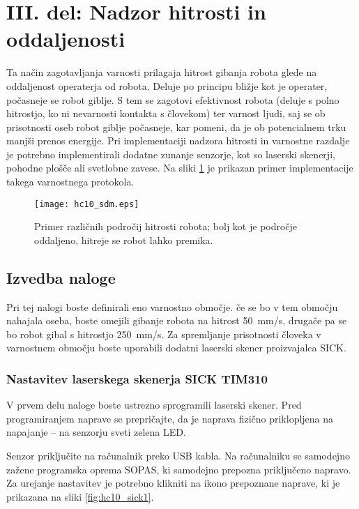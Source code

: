 \section{III. del: Nadzor hitrosti in oddaljenosti}

Ta način zagotavljanja varnosti prilagaja hitrost gibanja robota glede na oddaljenost operaterja od robota. Deluje po principu bližje kot je operater, počasneje se robot giblje. S tem se zagotovi efektivnost robota (deluje s polno hitrostjo, ko ni nevarnosti kontakta s človekom) ter varnost ljudi, saj se ob prisotnosti oseb robot giblje počasneje, kar pomeni, da je ob potencialnem trku manjši prenos energije. Pri implementaciji nadzora hitrosti in varnostne razdalje je potrebno implementirali dodatne zunanje senzorje, kot so laserski skenerji, pohodne plošče ali svetlobne zavese. Na sliki \ref{fig:hc10_sdm} je prikazan primer implementacije takega varnostnega protokola.

\begin{figure}[!hbt]
	\centering
	\texttt{[image: hc10\_sdm.eps]}
	\caption{Primer različnih področij hitrosti robota; bolj kot je področje oddaljeno, hitreje se robot lahko premika.}
	\label{fig:hc10_sdm}
\end{figure}

\subsection*{Izvedba naloge}

Pri tej nalogi boste definirali eno varnostno območje. če se bo v tem območju nahajala oseba, boste omejili gibanje robota na hitrost 50~mm/s, drugače pa se bo robot gibal s hitrostjo 250~mm/s. Za spremljanje prisotnosti človeka v varnostnem območju boste uporabili dodatni laserski skener proizvajalca SICK.

\subsubsection*{Nastavitev laserskega skenerja SICK TIM310}

V prvem delu naloge boste ustrezno sprogramili laserski skener. Pred programiranjem naprave se prepričajte, da je naprava fizično priklopljena na napajanje -- na senzorju sveti zelena LED.

Senzor priključite na računalnik preko USB kabla. Na računalniku se samodejno zažene programska oprema SOPAS, ki samodejno prepozna priključeno napravo. Za urejanje nastavitev je potrebno klikniti na ikono prepoznane naprave, ki je prikazana na sliki \ref{fig:hc10_sick1}.

